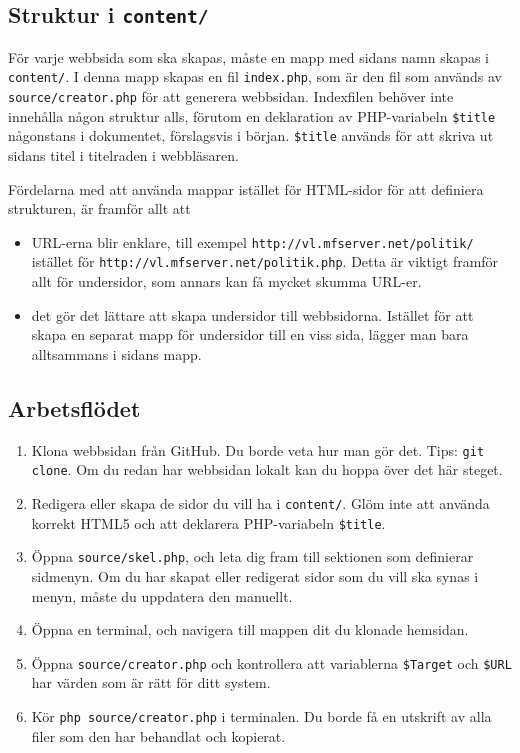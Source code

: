 \documentclass[a4paper,10pt]{article}
\begin{document}
\subsection{Struktur i {\tt content/}}
För varje webbsida som ska skapas, måste en mapp med sidans namn skapas i {\tt content/}. I denna mapp skapas en fil {\tt index.php}, som är den fil som används av {\tt source/creator.php} för att generera webbsidan. Indexfilen behöver inte innehålla någon struktur alls, förutom en deklaration av PHP-variabeln {\tt \$title} någonstans i dokumentet, förslagsvis i början. {\tt \$title} används för att skriva ut sidans titel i titelraden i webbläsaren. 

Fördelarna med att använda mappar istället för HTML-sidor för att definiera strukturen, är framför allt att

\begin{itemize}
	\item URL-erna blir enklare, till exempel {\tt http://vl.mfserver.net/politik/} istället för {\tt http://vl.mfserver.net/politik.php}. Detta är viktigt framför allt för undersidor, som annars kan få mycket skumma URL-er. 
	\item det gör det lättare att skapa undersidor till webbsidorna. Istället för att skapa en separat mapp för undersidor till en viss sida, lägger man bara alltsammans i sidans mapp. 
\end{itemize}

\subsection{Arbetsflödet}
\begin{enumerate}
	\item Klona webbsidan från GitHub. Du borde veta hur man gör det. Tips: {\tt git clone}. Om du redan har webbsidan lokalt kan du hoppa över det här steget. 
	\item Redigera eller skapa de sidor du vill ha i {\tt content/}. Glöm inte att använda korrekt HTML5 och att deklarera PHP-variabeln {\tt \$title}. 
	\item Öppna {\tt source/skel.php}, och leta dig fram till sektionen som definierar sidmenyn. Om du har skapat eller redigerat sidor som du vill ska synas i menyn, måste du uppdatera den manuellt. 
	\item Öppna en terminal, och navigera till mappen dit du klonade hemsidan. 
	\item Öppna {\tt source/creator.php} och kontrollera att variablerna {\tt \$Target} och {\tt \$URL} har värden som är rätt för ditt system. 
	\item Kör {\tt php source/creator.php} i terminalen. Du borde få en utskrift av alla filer som den har behandlat och kopierat. 
\end{enumerate}
\end{document}
